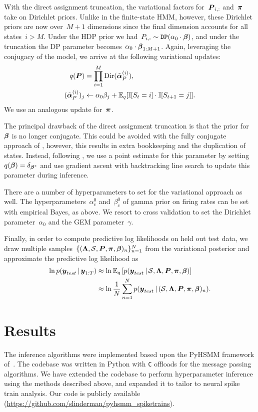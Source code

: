 With the direct assignment truncation, the variational factors for~$\boldsymbol{P}_{i,:}$ and~$\boldsymbol{\pi}$ take on Dirichlet priors. Unlike in the finite-state HMM, however, these Dirichlet priors are now over~${M+1}$ dimensions since the final dimension accounts for all states~${i>M}$. Under the HDP prior we had~${P_{i,:}\sim \texttt{DP}(\alpha_0 \cdot \boldsymbol{\beta})}$, and under the truncation the DP parameter becomes~$\alpha_0 \cdot \boldsymbol{\beta}_{1:M+1}$. Again, leveraging the conjugacy of the model, we arrive at the following variational updates:
\begin{align}
q(\boldsymbol{P}) &= \prod_{i=1}^M \mathrm{Dir}(\tilde{\boldsymbol{\alpha}}_P^{(i)}), \\
\nonumber (\tilde{\boldsymbol{\alpha}}_P^{(i)})_j &\leftarrow \alpha_0 \beta_j + \mathbb{E}_q[\mathbb{I}[S_t=i]\cdot\mathbb{I}[S_{t+1}=j]].
\end{align}
We use an analogous update for~$\boldsymbol{\pi}$.

The principal drawback of the direct assignment truncation is that the prior for~$\boldsymbol{\beta}$ is no longer conjugate. This could be avoided with the fully conjugate approach of \citep{Hoffman13}, however, this results in extra bookkeeping and the duplication of states. Instead, following \citep{Johnson14, Bryant12, Liang07}, we use a point estimate for this parameter by setting~${q(\boldsymbol{\beta})=\delta_{\boldsymbol{\beta}^*}}$ and use gradient ascent with backtracking line search to update this parameter during inference.

There are a number of hyperparameters to set for the variational approach as well. The hyperparameters~$\alpha_c^0$ and~$\beta_c^0$ of gamma prior on firing rates can be set with empirical Bayes, as above. We resort to cross validation to set the Dirichlet parameter~$\alpha_0$ and the GEM parameter~$\gamma$. 
 

Finally, in order to compute predictive log likelihoods on held out test data, we draw multiple samples~$\{(\boldsymbol{\Lambda}, \mathcal{S}, \boldsymbol{P}, \boldsymbol{\pi}, \boldsymbol{\beta})_n\}_{n=1}^N$ from the variational posterior and approximate the predictive log likelihood as
\begin{align}
\ln p(\boldsymbol{y}_{test} \,|\, \boldsymbol{y}_{1:T}) &\approx \ln \mathbb{E}_q\left[p(\boldsymbol{y}_{test} \,|\, \mathcal{S}, \boldsymbol{\Lambda},  \boldsymbol{P}, \boldsymbol{\pi}, \boldsymbol{\beta})\right] \\
\nonumber &\approx \ln \frac{1}{N} \sum_{n=1}^N p(\boldsymbol{y}_{test} \,|\, (\mathcal{S}, \boldsymbol{\Lambda}, \boldsymbol{P}, \boldsymbol{\pi}, \boldsymbol{\beta})_n).
\end{align}

\section{Results}
The inference algorithms were implemented based upon the PyHSMM framework of~\citep{Johnson14b}. The codebase was written in Python with \texttt{C} offloads for the message passing algorithms.  We have extended the codebase to perform hyperparameter inference using the methods described above, and expanded it to tailor to neural spike train analysis. Our code is publicly available ({\url{https://github.com/slinderman/pyhsmm_spiketrains}}).


